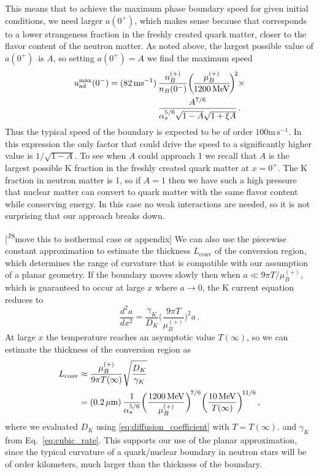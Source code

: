 \documentclass[10pt,superscriptaddress,
amsmath,aps,prc,twocolumn,nofootinbib,floatfix]{revtex4-1}
\newcommand{\mga}[1]{{\color[rgb]{0.6,0,0}#1}}
\newcommand{\JScom}[1]{\textsf{\color{violet} [\textsuperscript{JS}#1]}}
\newcommand{\al}{\alpha}
\newcommand{\ga}{\gamma}
\newcommand{\m}{\text{m}}
\newcommand{\s}{\text{s}}
\newcommand{\MeV}{\text{MeV}}
\newcommand{\azp}{\ensuremath{a(0^+)}}
\begin{document}
This means that to achieve the maximum phase boundary speed for given initial conditions,
we need larger \azp, which makes sense because that corresponds to a lower strangeness fraction in the freshly created quark matter, closer to the flavor content of the neutron matter.
As noted above, the largest possible value of \azp\ is $A$, so setting $\azp=A$ we find the maximum speed
\begin{align}
u^{\max}_{\rm ad} (0^-) = (82\,\m\s^{-1})\,
&\dfrac{n_B^{(+)}}{n_B(0^-)}
\biggl(\!\dfrac{\mu_B^{(+)}}{1200\,\MeV}\!\biggr)^{\!2}
\times \notag\\
& \dfrac{ A^{7/6}}{\al_s^{5/6} \sqrt{1-A}\sqrt{1+\xi A}} \, .\label{eq:speed_scaling}
\end{align}
\mga{Thus the typical speed of the boundary is expected to be of order $100\m\,\s^{-1}$.} In this expression the only factor that could drive the speed to a significantly higher value is $1/\sqrt{1-A}$. \mga{To see when $A$ could approach 1} we recall that $A$ is the largest possible K fraction in the freshly created quark matter at $x=0^+$. The K fraction in neutron matter is 1, so \mga{if $A=1$ then we have such a high pressure that} nuclear matter can convert to quark matter with the same flavor content while conserving energy. In this case no weak interactions are needed, so it is not surprising that our approach breaks down.

\JScom{move this to isothermal case or appendix} We can also use the piecewise constant approximation to estimate the thickness $L_{\text{conv}}$ of the conversion region, which determines the range of curvature that is compatible with our assumption of a  planar geometry. If the boundary moves slowly then when $a \ll 9\pi T/\mu_B^{(+)}$, which is guaranteed to occur at large $x$ where $a\to 0$, the K current equation reduces to
\begin{equation}
    \dfrac{d^2 a}{dx^2} =
    \dfrac{\ga_K}{D_K}\biggl(\dfrac{9\pi T}{\mu_B^{(+)}}\biggr)^{\!2} a \,.
\end{equation}
At large $x$ the temperature reaches an asymptotic value $T(\infty)$, so we can estimate the thickness of the conversion region as
\begin{align}
    L_{\text{conv}} &\approx \dfrac{\mu_B^{(+)}}{9\pi T(\infty)}\sqrt{\dfrac{D_K}{\ga_K}} \notag\\
    &= (0.2\,\mu\m)\,\dfrac{1}{\al_s^{5/6}}
    \biggl(\dfrac{1200\,\MeV}{\mu_B^{(+)}}\biggr)^{\!7/6}
     \biggl(\dfrac{10\,\MeV}{T(\infty)}\biggr)^{\!11/6}
    \,, \label{eq:conversion-thickness}
\end{align}
where we evaluated $D_K$ using \eqref{eq:diffusion_coefficient} with $T=T(\infty)$.
and $\gamma_K$ from Eq.~\eqref{eq:cubic_rate}.
This supports our use of the planar approximation, since the typical curvature of a quark/nuclear boundary in neutron stars will be of order kilometers, much larger than the thickness of the boundary.
\end{document}
